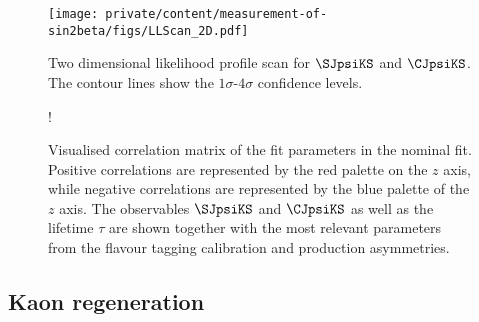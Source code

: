 %
\begin{figure}
\centering
\texttt{[image: private/content/measurement-of-sin2beta/figs/LLScan\_2D.pdf]}
\caption{Two dimensional likelihood profile scan for $\SJpsiKS$ and $\CJpsiKS$.
The contour lines show the $1\sigma$-$4\sigma$ confidence levels.}
\label{fig:measurement_of_sin2beta:cpv_measurement:results:plots:2d_ll_scan}
\end{figure}
%
\begin{figure}
\centering
\resizebox {1\textwidth} {!}{
   
}
\caption{Visualised correlation matrix of the fit parameters in
the nominal fit. Positive correlations are represented by the red palette on the
$z$ axis, while negative correlations are represented by the blue palette of the
$z$ axis. The \CP observables $\SJpsiKS$ and $\CJpsiKS$ as well as the
lifetime $\tau$ are shown together with the most relevant parameters from the
flavour tagging calibration and production asymmetries.}
\label{fig:measurement_of_sin2beta:cpv_measurement:results:plots:correlation_matrix}
\end{figure}

\FloatBarrier
\subsection{Kaon regeneration}
\label{sec:measurement_of_sin2beta:cpv_measurement:kaon_regeneration}


